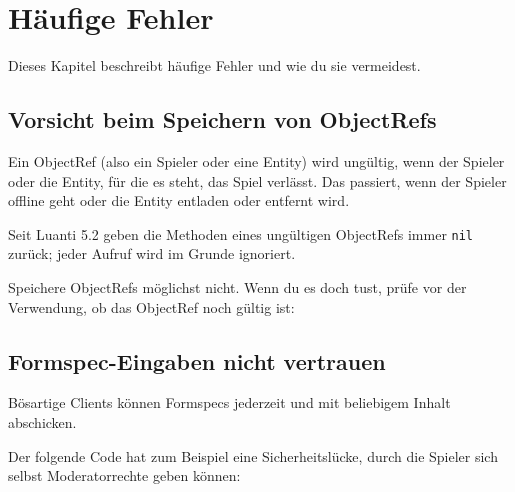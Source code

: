 \chapter{Häufige Fehler}
\label{ch:quality/common-mistakes}

Dieses Kapitel beschreibt häufige Fehler und wie du sie vermeidest.

\section{Vorsicht beim Speichern von
ObjectRefs}\label{vorsicht-beim-speichern-von-objectrefs}

Ein ObjectRef (also ein Spieler oder
eine Entity) wird ungültig, wenn der Spieler oder
die Entity, für die es steht, das Spiel verlässt. Das passiert, wenn der
Spieler offline geht oder die Entity entladen oder entfernt wird.

Seit Luanti 5.2 geben die Methoden eines ungültigen ObjectRefs immer
\texttt{nil} zurück; jeder Aufruf wird im Grunde ignoriert.

Speichere ObjectRefs möglichst nicht. Wenn du es doch tust, prüfe vor
der Verwendung, ob das ObjectRef noch gültig ist:

\begin{Shaded}
\begin{Highlighting}[]
 \OperatorTok{:}\OperatorTok{()} 
\end{Highlighting}
\end{Shaded}

\section{Formspec-Eingaben nicht
vertrauen}\label{formspec-eingaben-nicht-vertrauen}

Bösartige Clients können Formspecs jederzeit
und mit beliebigem Inhalt abschicken.

Der folgende Code hat zum Beispiel eine Sicherheitslücke, durch die
Spieler sich selbst Moderatorrechte geben können:

